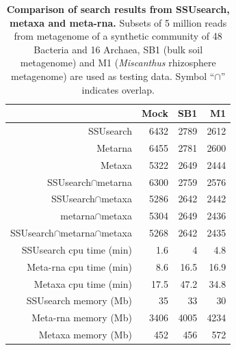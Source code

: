 \documentclass[]{msu-thesis}
\begin{document}
\begin{table}[htbp]
  \centering
  \caption[Comparison of search results from SSUsearch, metaxa and meta-rna]{\textbf{Comparison of search results from SSUsearch, metaxa and meta-rna.} Subsets of 5 million reads from metagenome of a synthetic community of 48 Bacteria and 16 Archaea, SB1 (bulk soil metagenome) and M1 (\textit{Miscanthus} rhizosphere metagenome) are used as testing data. Symbol ``$\cap$'' indicates overlap.}
    \begin{tabular}{|r|r|r|r|}
    \toprule
          & Mock  & SB1   & M1 \\
    \midrule
    SSUsearch & 6432  & 2789  & 2612 \\
    Metarna & 6455  & 2781  & 2600 \\
    Metaxa & 5322  & 2649  & 2444 \\
    \multicolumn{1}{|r|}{SSUsearch$\cap$metarna} & 6300  & 2759  & 2576 \\
    \multicolumn{1}{|r|}{SSUsearch$\cap$metaxa} & 5286  & 2642  & 2442 \\
    \multicolumn{1}{|r|}{metarna$\cap$metaxa} & 5304  & 2649  & 2436 \\
    \multicolumn{1}{|r|}{SSUsearch$\cap$metarna$\cap$metaxa} & 5268  & 2642  & 2435 \\
    \midrule
    \midrule
    SSUsearch cpu time (min) & 1.6   & 4     & 4.8 \\
    Meta-rna cpu time (min) & 8.6   & 16.5  & 16.9 \\
    Metaxa cpu time (min) & 17.5  & 47.2  & 34.8 \\
    \midrule
    \midrule
    SSUsearch memory (Mb) & 35    & 33    & 30 \\
    Meta-rna memory (Mb) & 3406  & 4005  & 4234 \\
    Metaxa memory (Mb) & 452   & 456   & 572 \\
    \bottomrule
    \end{tabular}%
  \label{tab:chap2Tab1}%
\end{table}%
\end{document}
